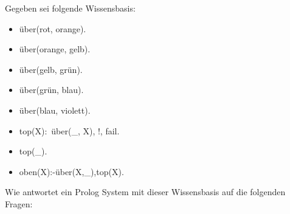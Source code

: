 \documentclass[10pt, a4paper]{exam}
\begin{document}
\begin{questions}
  \question Gegeben sei folgende Wissensbasis:\begin{itemize}
    \item über(rot, orange).
    \item über(orange, gelb).
    \item über(gelb, grün).
    \item über(grün, blau).
    \item über(blau, violett).
    \item top(X):~über(\_, X), !, fail.
    \item top(\_).
    \item oben(X):-über(X,\_),top(X).
  \end{itemize} Wie antwortet ein Prolog System mit dieser Wissensbasis auf die folgenden Fragen:
\end{questions}
\end{document}

